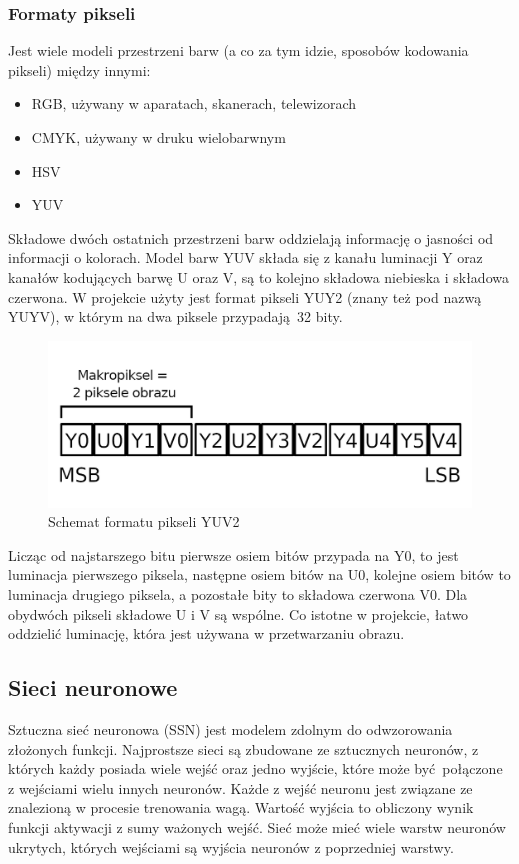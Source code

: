 \documentclass[12pt, oneside, a4paper]{article}
\begin{document}
\subsubsection{Formaty pikseli}
Jest wiele modeli przestrzeni barw (a co za tym idzie, sposobów kodowania
pikseli) między innymi:
\begin{itemize}
  \item RGB, używany w aparatach, skanerach, telewizorach
  \item CMYK, używany w druku wielobarwnym
  \item HSV
  \item YUV
\end{itemize}
Składowe dwóch ostatnich przestrzeni barw oddzielają informację o jasności
od informacji o kolorach. Model barw YUV składa się z kanału luminacji Y
oraz kanałów kodujących barwę U oraz V, są to kolejno składowa niebieska
i składowa czerwona. W projekcie użyty jest format pikseli YUY2 (znany też
pod nazwą YUYV), w którym na dwa piksele przypadają 32 bity.
\begin{figure}[h]
  \centering
  \includegraphics[scale=1.2]{figures/yuv2-scheme.png} 
  \caption{Schemat formatu pikseli YUV2}\label{fig:yuv2}
\end{figure}
Licząc od najstarszego bitu pierwsze osiem bitów przypada na Y0, to jest
luminacja pierwszego piksela, następne osiem bitów na U0, kolejne osiem bitów
to luminacja drugiego piksela, a pozostałe bity to składowa czerwona V0.
Dla obydwóch pikseli składowe U i V są wspólne. Co istotne w projekcie,
łatwo oddzielić luminację, która jest używana w przetwarzaniu obrazu.

\subsection{Sieci neuronowe}
Sztuczna sieć neuronowa (SSN) jest modelem zdolnym do odwzorowania złożonych
funkcji. Najprostsze sieci są zbudowane ze sztucznych neuronów, z których każdy
posiada wiele wejść oraz jedno wyjście, które może być połączone z wejściami
wielu innych neuronów. Każde z wejść neuronu jest związane ze znalezioną
w procesie trenowania wagą. Wartość wyjścia to obliczony wynik funkcji aktywacji
z sumy ważonych wejść. Sieć może mieć wiele warstw neuronów ukrytych, których
wejściami są wyjścia neuronów z poprzedniej warstwy. 
\end{document}
